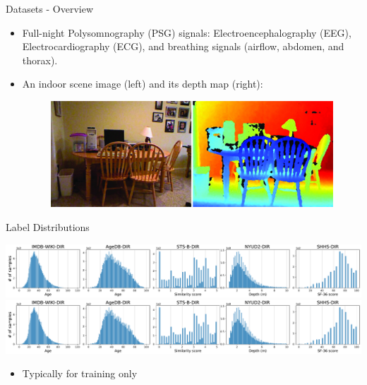 \begin{frame}{Datasets - Overview}
\begin{table}[!t]
\begin{center}
		\end{center}
	\end{table}
	\begin{itemize}\tiny
		\item<2-> Full-night Polysomnography (PSG) signals: Electroencephalography (EEG), Electrocardiography (ECG), and breathing signals (airflow, abdomen, and thorax).
		\item<2-> An indoor scene image (left) and its depth map (right):
		\begin{figure}[h]
			\includegraphics[width=0.5\linewidth]{images/nyu_depth_v2_raw.jpg}
		\end{figure}
	\end{itemize}
\end{frame}

\begin{frame}{Label Distributions}
	\begin{center}
		\includegraphics[trim={0 0 52em 0},clip,scale=0.4]{images/dataset_info.pdf}
		\includegraphics[trim={78.8em 0 0 0},clip,scale=0.4]{images/dataset_info.pdf}
	\end{center}
	\begin{itemize}
		\item Typically for training only
	\end{itemize}
\end{frame}